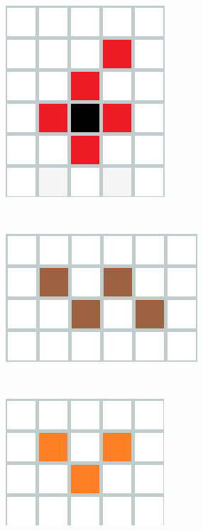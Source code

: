 \begin{figure}[h]
	
	\begin{minipage}{3.5cm}
		\centering
		\includegraphics[scale=0.30]{immagini/p}
		\caption{}
		\label{p}
	\end{minipage}
	\ \hspace{2mm} \hspace{3mm} \
	\begin{minipage}{3.5cm}
		\centering
		\includegraphics[scale=0.30]{immagini/z}
		\caption{}
		\label{z}
	\end{minipage}
	\ \hspace{2mm} \hspace{3mm} \
	\begin{minipage}{3.5cm}
		\centering
		\includegraphics[scale=0.30]{immagini/smallv}
		\caption{}
		\label{smallv}
	\end{minipage}
\end{figure}

